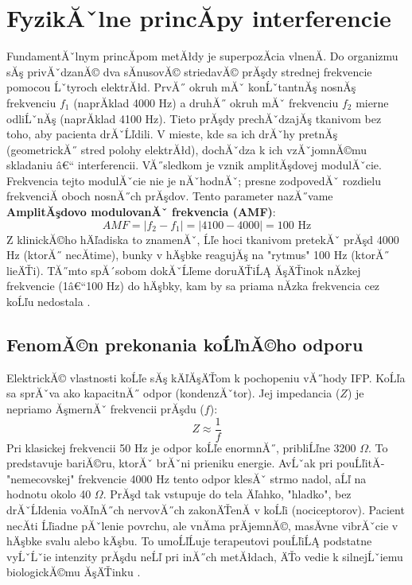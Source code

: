 \section{FyzikĂˇlne princĂ­py interferencie}

FundamentĂˇlnym princĂ­pom metĂłdy je superpozĂ­cia vlnenĂ­. Do organizmu sĂş privĂˇdzanĂ© dva sĂ­nusovĂ© striedavĂ© prĂşdy strednej frekvencie pomocou Ĺˇtyroch elektrĂłd. PrvĂ˝ okruh mĂˇ konĹˇtantnĂş nosnĂş frekvenciu $f_1$ (naprĂ­klad 4000 Hz) a druhĂ˝ okruh mĂˇ frekvenciu $f_2$ mierne odliĹˇnĂş (naprĂ­klad 4100 Hz). Tieto prĂşdy prechĂˇdzajĂş tkanivom bez toho, aby pacienta drĂˇĹľdili. V mieste, kde sa ich drĂˇhy pretnĂş (geometrickĂ˝ stred polohy elektrĂłd), dochĂˇdza k ich vzĂˇjomnĂ©mu skladaniu â€“ interferencii. VĂ˝sledkom je vznik amplitĂşdovej modulĂˇcie. Frekvencia tejto modulĂˇcie nie je nĂˇhodnĂˇ; presne zodpovedĂˇ rozdielu frekvenciĂ­ oboch nosnĂ˝ch prĂşdov. Tento parameter nazĂ˝vame \textbf{AmplitĂşdovo modulovanĂˇ frekvencia (AMF)}:
\[
AMF = |f_2 - f_1| = |4100 - 4000| = 100 \text{ Hz}
\]
Z klinickĂ©ho hÄľadiska to znamenĂˇ, Ĺľe hoci tkanivom pretekĂˇ prĂşd 4000 Hz (ktorĂ˝ necĂ­time), bunky v hÄşbke reagujĂş na "rytmus" 100 Hz (ktorĂ˝ lieÄŤi). TĂ˝mto spĂ´sobom dokĂˇĹľeme doruÄŤiĹĄ ĂşÄŤinok nĂ­zkej frekvencie (1â€“100 Hz) do hÄşbky, kam by sa priama nĂ­zka frekvencia cez koĹľu nedostala \parencite{Robertson2006, Goats1990}.

\subsection{FenomĂ©n prekonania koĹľnĂ©ho odporu}

ElektrickĂ© vlastnosti koĹľe sĂş kÄľĂşÄŤom k pochopeniu vĂ˝hody IFP. KoĹľa sa sprĂˇva ako kapacitnĂ˝ odpor (kondenzĂˇtor). Jej impedancia ($Z$) je nepriamo ĂşmernĂˇ frekvencii prĂşdu ($f$):
\[
Z \approx \frac{1}{f}
\]
Pri klasickej frekvencii 50 Hz je odpor koĹľe enormnĂ˝, pribliĹľne 3200 $\Omega$. To predstavuje bariĂ©ru, ktorĂˇ brĂˇni prieniku energie. AvĹˇak pri pouĹľitĂ­ "nemecovskej" frekvencie 4000 Hz tento odpor klesĂˇ strmo nadol, aĹľ na hodnotu okolo 40 $\Omega$. PrĂşd tak vstupuje do tela Äľahko, "hladko", bez drĂˇĹľdenia voÄľnĂ˝ch nervovĂ˝ch zakonÄŤenĂ­ v koĹľi (nociceptorov). Pacient necĂ­ti Ĺľiadne pĂˇlenie povrchu, ale vnĂ­ma prĂ­jemnĂ©, masĂ­vne vibrĂˇcie v hÄşbke svalu alebo kÄşbu. To umoĹľĹuje terapeutovi pouĹľiĹĄ podstatne vyĹˇĹˇie intenzity prĂşdu neĹľ pri inĂ˝ch metĂłdach, ÄŤo vedie k silnejĹˇiemu biologickĂ©mu ĂşÄŤinku \parencite{Navratil2019, Watson2020}.

